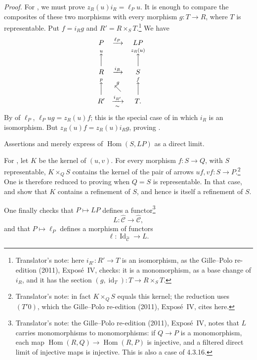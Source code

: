 \noindent\textit{Proof.}
For , we must prove \(z_R(u)i_R=\ell_Pu\). It is enough to compare the
composites of these two morphisms with every morphism \(g:T\to R\), where
\(T\) is representable. Put \(f=i_Rg\) and
\(R'=R\times_ST\).\footnote{Translator's note: here \(i_{R'}\colon R'\to T\) is an
isomorphism, as the Gille--Polo re-edition (2011), Expos\'e~IV, checks: it is
a monomorphism, as a base change of \(i_R\), and it has the section
\((g,\operatorname{id}_T)\colon T\to R\times_ST\).} We have
\[
\begin{array}{ccccc}
 P&\xrightarrow{\ell_P}&LP&&\\
 \overset{u}{\Big\uparrow}&&
 \overset{z_R(u)}{\Big\uparrow}&&\\
 R&\xrightarrow{i_R}&S&&\\
 \overset{p}{\Big\uparrow}&\overset{g}{\nwarrow}&
 \overset{f}{\Big\uparrow}&&\\
 R'&\xrightarrow[\sim]{i_{R'}}&T.&&
\end{array}
\]
By  of \(\ell_P\),
\(\ell_Pug=z_R(u)f\); this is the special case of  in which
\(i_R\) is an isomorphism. But \(z_R(u)f=z_R(u)i_Rg\), proving .

Assertions  and  merely express  of
\(\operatorname{Hom}(S,LP)\) as a direct limit.

For , let \(K\) be the kernel of \((u,v)\). For every morphism
\(f:S\to Q\), with \(S\) representable, \(K\times_QS\) contains the kernel of
the pair of arrows \(uf,vf:S\to P\).\footnote{Translator's note: in fact \(K\times_QS\) equals this
kernel; the reduction uses \((T'0)\), which the Gille--Polo re-edition (2011),
Expos\'e~IV, cites here.} One is therefore reduced to proving
 when \(Q=S\) is representable. In that case,  and
 show that \(K\) contains a refinement of \(S\), and hence is itself a
refinement of \(S\).

One finally checks that \(P\mapsto LP\) defines a functor\footnote{Translator's note: the Gille--Polo re-edition (2011), Expos\'e~IV, notes
that \(L\) carries monomorphisms to monomorphisms: if \(Q\to P\) is a
monomorphism, each map \(\operatorname{Hom}(R,Q)\to\operatorname{Hom}(R,P)\) is
injective, and a filtered direct limit of injective maps is injective. This
is also a case of 4.3.16.}
\[
 L:\widehat{\mathscr C}\longrightarrow\widehat{\mathscr C},
\]
and that \(P\mapsto\ell_P\) defines a morphism of functors
\[
 \ell:\operatorname{Id}_{\widehat{\mathscr C}}\longrightarrow L.
\]

